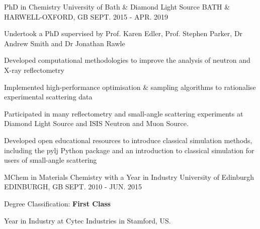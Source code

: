 \begin{cventries}
  \cventry
    {PhD in Chemistry}
    {University of Bath & Diamond Light Source}
    {BATH & HARWELL-OXFORD, GB}
    {SEPT. 2015 - APR. 2019}
    {
      \begin{cvitems}
        \item {Undertook a PhD supervised by Prof. Karen Edler, Prof. Stephen Parker, Dr Andrew Smith and Dr Jonathan Rawle}
        \item {Developed computational methodologies to improve the analysis of neutron and X-ray reflectometry}
        \item {Implemented high-performance optimisation \& sampling algorithms to rationalise experimental scattering data}
        \item {Participated in many reflectometry and small-angle scattering experiments at Diamond Light Source and ISIS Neutron and Muon Source.}
        \item {Developed open educational resources to introduce classical simulation methods, including the pylj Python package and an introduction to classical simulation for users of small-angle scattering}
      \end{cvitems}
    }
  \cventry
    {MChem in Materials Chemistry with a Year in Industry}
    {University of Edinburgh}
    {EDINBURGH, GB}
    {SEPT. 2010 - JUN. 2015}
    {
      \begin{cvitems}
        \item {Degree Classification: \textbf{First Class}}
        \item {Year in Industry at Cytec Industries in Stamford, US.}
      \end{cvitems}
    }
\end{cventries}

